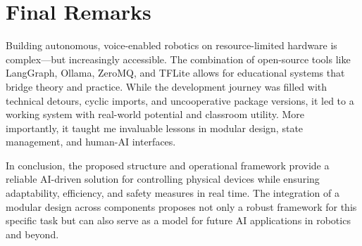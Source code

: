 \section{Final Remarks}

Building autonomous, voice-enabled robotics on resource-limited hardware is complex—but increasingly accessible. The combination of open-source tools like LangGraph, Ollama, ZeroMQ, and TFLite allows for educational systems that bridge theory and practice. While the development journey was filled with technical detours, cyclic imports, and uncooperative package versions, it led to a working system with real-world potential and classroom utility. More importantly, it taught me invaluable lessons in modular design, state management, and human-AI interfaces.



In conclusion, the proposed structure and operational framework provide a reliable AI-driven solution for controlling physical devices while ensuring adaptability, efficiency, and safety measures in real time. The integration of a modular design across components proposes not only a robust framework for this specific task but can also serve as a model for future AI applications in robotics and beyond.

